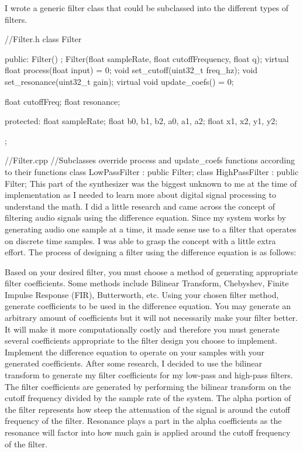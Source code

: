 \documentclass[acmlarge,screen]{acmart}
\begin{document}
I wrote a generic filter class that could be subclassed into the different types of filters.

//Filter.h
class Filter {
	public:
	Filter() {};
	Filter(float sampleRate, float cutoffFrequency, float q);
	virtual float process(float input) = 0;
	void set_cutoff(uint32_t freq_hz);
	void set_resonance(uint32_t gain);
	virtual void update_coefs() = 0;
	
	float cutoffFreq;
	float resonance;
	
	protected:
	float sampleRate;
	float b0, b1, b2, a0, a1, a2;
	float x1, x2, y1, y2;
};

//Filter.cpp
//Subclasses override process and update_coefs functions according to their functions
class LowPassFilter : public Filter;
class HighPassFilter : public Filter;
This part of the synthesizer was the biggest unknown to me at the time of implementation as I needed to learn more about digital signal processing to understand the math. I did a little research and came across the concept of filtering audio signals using the difference equation. Since my system works by generating audio one sample at a time, it made sense use to a filter that operates on discrete time samples. I was able to grasp the concept with a little extra effort. The process of designing a filter using the difference equation is as follows:

Based on your desired filter, you must choose a method of generating appropriate filter coefficients. Some methods include Bilinear Transform, Chebyshev, Finite Impulse Response (FIR), Butterworth, etc.
Using your chosen filter method, generate coefficients to be used in the difference equation. You may generate an arbitrary amount of coefficients but it will not necessarily make your filter better. It will make it more computationally costly and therefore you must generate several coefficients appropriate to the filter design you choose to implement.
Implement the difference equation to operate on your samples with your generated coefficients.
After some research, I decided to use the bilinear transform to generate my filter coefficients for my low-pass and high-pass filters. The filter coefficients are generated by performing the bilinear transform on the cutoff frequency divided by the sample rate of the system. The alpha portion of the filter represents how steep the attenuation of the signal is around the cutoff frequency of the filter. Resonance plays a part in the alpha coefficients as the resonance will factor into how much gain is applied around the cutoff frequency of the filter.
\end{document}
